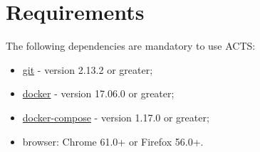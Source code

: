 \section{Requirements}\label{req}

The following dependencies are mandatory to use ACTS:
\begin{itemize}
   \item \href{https://git-scm.com/}{git} - version 2.13.2 or greater;
   \item \href{https://www.docker.com/get-docker}{docker} - version 17.06.0 or greater;
   \item \href{https://docs.docker.com/compose/install/}{docker-compose} - version 1.17.0 or greater;
   \item browser: Chrome 61.0+ or Firefox 56.0+.
\end{itemize}
